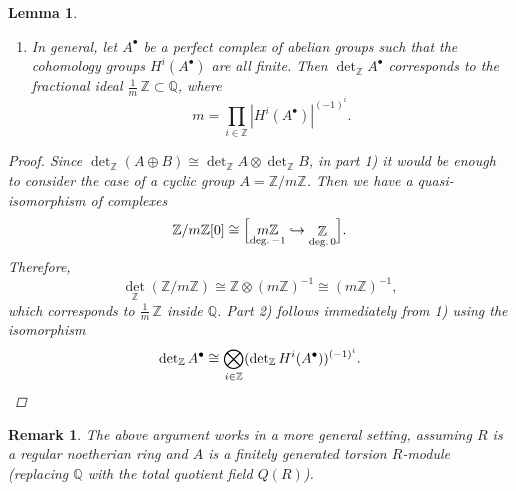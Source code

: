 \documentclass[10pt,a4paper,oneside,draft]{article}
\newcommand{\QQ}{\mathbb{Q}}
\newcommand{\ZZ}{\mathbb{Z}}
\renewcommand{\det}{\operatorname{det}}
\theoremstyle{myplain}
\newtheorem{lemma}[theorem]{Lemma}
\theoremstyle{mydefinition}
\newtheorem{remark}[theorem]{Remark}
\numberwithin{equation}{section}
\begin{document}
\begin{appendices}
\begin{lemma}
\begin{enumerate}
  \item[2)] In general, let $A^\bullet$ be a perfect complex of abelian groups
    such that the cohomology groups $H^i (A^\bullet)$ are all finite. Then
    $\det_\ZZ A^\bullet$ corresponds to the fractional ideal
    $\frac{1}{m}\,\ZZ \subset \QQ$, where
    $$m = \prod_{i\in \ZZ} |H^i (A^\bullet)|^{(-1)^i}.$$
  \end{enumerate}

  \begin{proof}
    Since $\det_\ZZ (A\oplus B) \cong \det_\ZZ A \otimes \det_\ZZ B$, in
    part 1) it would be enough to consider the case of a cyclic group
    $A = \ZZ/m\ZZ$. Then we have a quasi-isomorphism of complexes
    \[ \ZZ/m\ZZ [0] \cong \Bigl[
      \mathop{m\ZZ}_{\text{deg.\,}-1} \hookrightarrow
      \mathop{\ZZ}_{\text{deg.\,}0}
      \Bigr]. \]
    Therefore,
    $$\det_\ZZ (\ZZ/m\ZZ) \cong \ZZ \otimes (m\ZZ)^{-1} \cong (m\ZZ)^{-1},$$
    which corresponds to $\frac{1}{m}\,\ZZ$ inside $\QQ$.
    Part 2) follows immediately from 1) using the isomorphism
    \[ \det_\ZZ A^\bullet \cong
      \bigotimes_{i\in \ZZ} (\det_\ZZ H^i (A^\bullet))^{(-1)^i}. \qedhere \]
  \end{proof}
\end{lemma}

\begin{remark}
  The above argument works in a more general setting, assuming $R$ is a regular
  noetherian ring and $A$ is a finitely generated torsion $R$-module (replacing
  $\QQ$ with the total quotient field $Q (R)$).
\end{remark}

\end{appendices}




\end{document}

